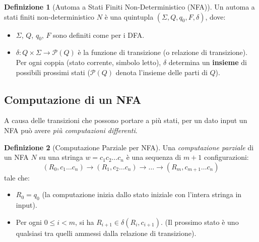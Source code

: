 \documentclass[a4paper]{article}
\theoremstyle{definition} %
\newtheorem{definition}{Definizione}[section]
\begin{document}
\begin{definition}[Automa a Stati Finiti Non-Deterministico (NFA)]
Un automa a stati finiti non-deterministico $N$ è una quintupla $( \Sigma, Q, q_0, F, \delta )$, dove:
\begin{itemize}
    \item $\Sigma$, $Q$, $q_0$, $F$ sono definiti come per i DFA.
    \item $\delta: Q \times \Sigma \to \mathcal{P}(Q)$ è la funzione di transizione (o relazione di transizione). Per ogni coppia (stato corrente, simbolo letto), $\delta$ determina un \textbf{insieme} di possibili prossimi stati ($\mathcal{P}(Q)$ denota l'insieme delle parti di $Q$).
\end{itemize}
\end{definition}

\subsection{Computazione di un NFA}
A causa delle transizioni che possono portare a più stati, per un dato input un NFA può avere \emph{più computazioni differenti}.

\begin{definition}[Computazione Parziale per NFA]
Una \emph{computazione parziale} di un NFA $N$ su una stringa $w = c_1 c_2 \dots c_n$ è una sequenza di $m+1$ configurazioni:
\[ (R_0, c_1 \dots c_n) \xrightarrow{} (R_1, c_2 \dots c_n) \xrightarrow{} \dots \xrightarrow{} (R_m, c_{m+1} \dots c_n) \]
tale che:
\begin{itemize}
    \item $R_0 = q_0$ (la computazione inizia dallo stato iniziale con l'intera stringa in input).
    \item Per ogni $0 \leq i < m$, si ha $R_{i+1} \in \delta(R_i, c_{i+1})$. (Il prossimo stato è uno qualsiasi tra quelli ammessi dalla relazione di transizione).
\end{itemize}
\end{definition}
\end{document}

